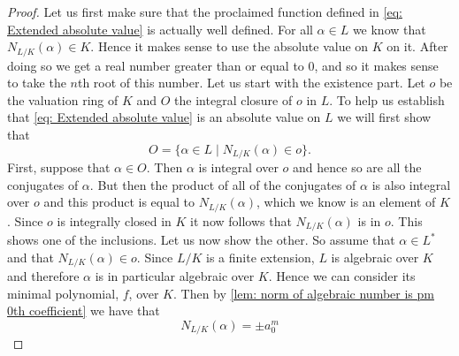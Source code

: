 \documentclass{article}
\numberwithin{equation}{section}
\begin{document}
\begin{proof}
    Let us first make sure that the proclaimed function defined in \cref{eq: Extended absolute value} is actually well defined. For all $\alpha \in L$ we know that $N_{L/K}(\alpha) \in K$. Hence it makes sense to use the absolute value on $K$ on it. After doing so we get a real number greater than or equal to 0, and so it makes sense to take the $n$th root of this number. Let us start with the existence part. Let $o$ be the valuation ring of $K$ and $O$ the integral closure of $o$ in $L$. To help us establish that \cref{eq: Extended absolute value} is an absolute value on $L$ we will first show that
    \begin{equation}\label{eq: Extension of absolute value helper result}
        O = \{\alpha \in L \mid N_{L/K}(\alpha) \in o \}.\tag{$\triangle$}
    \end{equation}
    First, suppose that $\alpha \in O$. Then $\alpha$ is integral over $o$ and hence so are all the conjugates of $\alpha$. But then the product of all of the conjugates of $\alpha$ is also integral over $o$ and this product is equal to $N_{L/K}(\alpha)$, which we know is an element of $K$. Since $o$ is integrally closed in $K$ it now follows that $N_{L/K}(\alpha)$ is in $o$. This shows one of the inclusions. Let us now show the other. So assume that $\alpha \in L^*$ and that $N_{L/K}(\alpha) \in o$. Since $L / K$ is a finite extension, $L$ is algebraic over $K$ and therefore $\alpha$ is in particular algebraic over $K$. Hence we can consider its minimal polynomial, $f$, over $K$. Then by \cref{lem: norm of algebraic number is pm 0th coefficient} we have that
    $$N_{L / K}(\alpha) =  \pm a_0^m$$

\end{proof}
\end{document}

